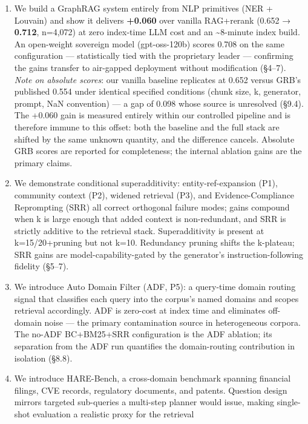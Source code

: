 \documentclass[
]{article}
\providecommand{\tightlist}{%
  \setlength{\itemsep}{0pt}\setlength{\parskip}{0pt}}
\begin{document}
\begin{enumerate}
\def\labelenumi{\arabic{enumi}.}
\tightlist
\item
  We build a GraphRAG system entirely from NLP primitives (NER +
  Louvain) and show it delivers \textbf{+0.060} over vanilla RAG+rerank
  (0.652 → \textbf{0.712}, n=4,072) at zero index-time LLM cost and an
  \textasciitilde8-minute index build. An open-weight sovereign model
  (gpt-oss-120b) scores 0.708 on the same configuration ---
  statistically tied with the proprietary leader --- confirming the
  gains transfer to air-gapped deployment without modification (§4--7).
  \emph{Note on absolute scores}: our vanilla baseline replicates at
  0.652 versus GRB's published 0.554 under identical specified
  conditions (chunk size, k, generator, prompt, NaN convention) --- a
  gap of 0.098 whose source is unresolved (§9.4). The +0.060 gain is
  measured entirely within our controlled pipeline and is therefore
  immune to this offset: both the baseline and the full stack are
  shifted by the same unknown quantity, and the difference cancels.
  Absolute GRB scores are reported for completeness; the internal
  ablation gains are the primary claims.
\item
  We demonstrate conditional superadditivity: entity-ref-expansion (P1),
  community context (P2), widened retrieval (P3), and
  Evidence-Compliance Reprompting (SRR) all correct orthogonal failure
  modes; gains compound when k is large enough that added context is
  non-redundant, and SRR is strictly additive to the retrieval stack.
  Superadditivity is present at k=15/20+pruning but not k=10. Redundancy
  pruning shifts the k-plateau; SRR gains are model-capability-gated by
  the generator's instruction-following fidelity (§5--7).
\item
  We introduce Auto Domain Filter (ADF, P5): a query-time domain routing
  signal that classifies each query into the corpus's named domains and
  scopes retrieval accordingly. ADF is zero-cost at index time and
  eliminates off-domain noise --- the primary contamination source in
  heterogeneous corpora. The no-ADF BC+BM25+SRR configuration is the ADF
  ablation; its separation from the ADF run quantifies the
  domain-routing contribution in isolation (§8.8).
\item
  We introduce HARE-Bench, a cross-domain benchmark spanning financial
  filings, CVE records, regulatory documents, and patents. Question
  design mirrors targeted sub-queries a multi-step planner would issue,
  making single-shot evaluation a realistic proxy for the retrieval

\end{enumerate}
\end{document}
